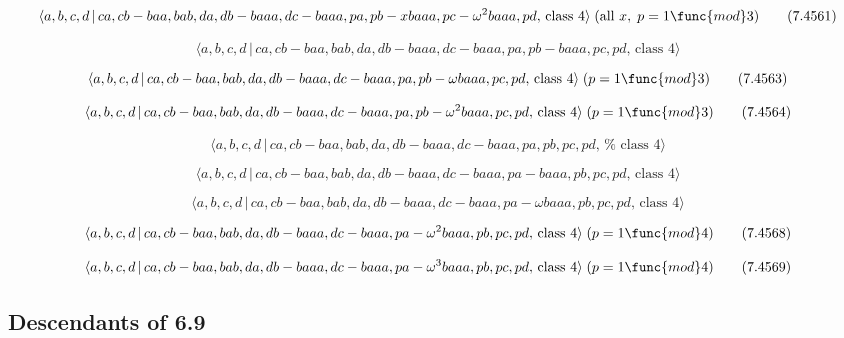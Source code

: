 \documentclass[10pt]{article}
\begin{document}
\begin{equation}
\langle a,b,c,d\,|\,ca,cb-baa,bab,da,db-baaa,dc-baaa,pa,pb-xbaaa,pc-\omega
^{2}baaa,pd,\,\text{class }4\rangle \;(\text{all }x,\;p=1\func{mod}3) 
\tag{7.4561}
\end{equation}

\begin{equation}
\langle a,b,c,d\,|\,ca,cb-baa,bab,da,db-baaa,dc-baaa,pa,pb-baaa,pc,pd,\,%
\text{class }4\rangle  \tag{7.4562}
\end{equation}

\begin{equation}
\langle a,b,c,d\,|\,ca,cb-baa,bab,da,db-baaa,dc-baaa,pa,pb-\omega
baaa,pc,pd,\,\text{class }4\rangle \;(p=1\func{mod}3)  \tag{7.4563}
\end{equation}

\begin{equation}
\langle a,b,c,d\,|\,ca,cb-baa,bab,da,db-baaa,dc-baaa,pa,pb-\omega
^{2}baaa,pc,pd,\,\text{class }4\rangle \;(p=1\func{mod}3)  \tag{7.4564}
\end{equation}

\begin{equation}
\langle a,b,c,d\,|\,ca,cb-baa,bab,da,db-baaa,dc-baaa,pa,pb,pc,pd,\,\text{%
class }4\rangle  \tag{7.4565}
\end{equation}

\begin{equation}
\langle a,b,c,d\,|\,ca,cb-baa,bab,da,db-baaa,dc-baaa,pa-baaa,pb,pc,pd,\,%
\text{class }4\rangle  \tag{7.4566}
\end{equation}

\begin{equation}
\langle a,b,c,d\,|\,ca,cb-baa,bab,da,db-baaa,dc-baaa,pa-\omega
baaa,pb,pc,pd,\,\text{class }4\rangle  \tag{7.4567}
\end{equation}

\begin{equation}
\langle a,b,c,d\,|\,ca,cb-baa,bab,da,db-baaa,dc-baaa,pa-\omega
^{2}baaa,pb,pc,pd,\,\text{class }4\rangle \;(p=1\func{mod}4)  \tag{7.4568}
\end{equation}

\begin{equation}
\langle a,b,c,d\,|\,ca,cb-baa,bab,da,db-baaa,dc-baaa,pa-\omega
^{3}baaa,pb,pc,pd,\,\text{class }4\rangle \;(p=1\func{mod}4)  \tag{7.4569}
\end{equation}

\subsection{Descendants of 6.9}
\end{document}
